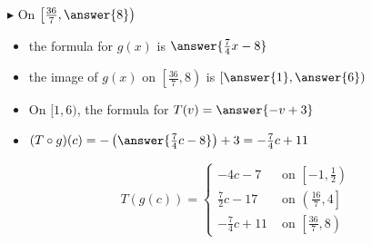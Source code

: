 \documentclass{ximera}
\begin{document}
\begin{explanation}
\begin{itemize}
\end{itemize}












$\blacktriangleright$ On $\left[ \frac{36}{7}, \answer{8} \right)$



\begin{itemize}

\item the formula for $g(x)$ is $\answer{\frac{7}{4}x - 8}$
\item the image of $g(x)$ on $\left[ \frac{36}{7}, 8 \right)$ is $\left[ \answer{1}, \answer{6} \right)$
\item On $[ 1, 6 )$, the formula for $T(v) = \answer{-v + 3}$  \\
\item $(T \circ g)(c) = -\left(\answer{\frac{7}{4}c - 8}\right) + 3 = -\frac{7}{4}c + 11$ \\


\end{itemize}

































\[
T(g(c)) = 
\begin{cases}
  -4c - 7                &       \text{ on }     \left[-1, \frac{1}{2}\right) \\
  \frac{7}{2}c - 17     &     \text{ on }  \left(\frac{16}{7}, 4\right] \\
  -\frac{7}{4}c + 11   &     \text{ on }  \left[\frac{36}{7}, 8\right)
\end{cases}
\]


  

\end{explanation}
\end{document}
